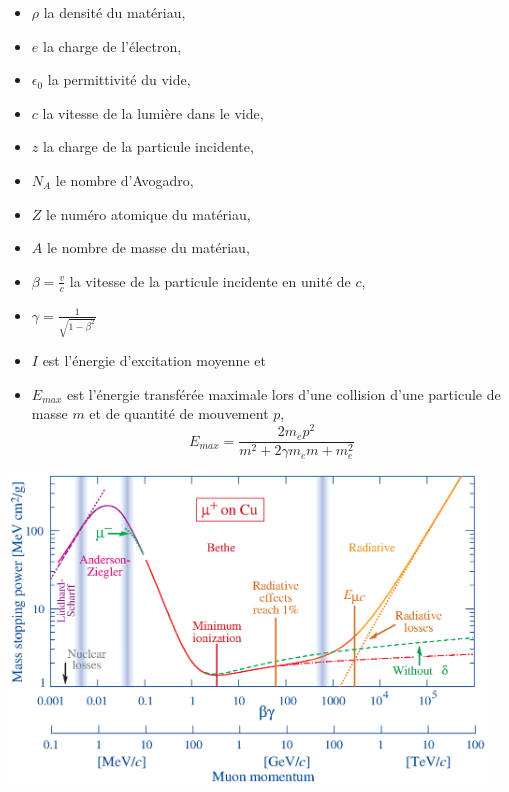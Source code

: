 \begin{itemize}[label=$\bullet$]
	\item $\rho$ la densité du matériau,
	\item $e$ la charge de l'électron,
	\item $\epsilon_{0}$ la permittivité du vide,
	\item $c$ la vitesse de la lumière dans le vide,
	\item $z$ la charge de la particule incidente,
	\item $N_{A}$ le nombre d'Avogadro,
	\item $Z$ le numéro atomique du matériau,
	\item $A$ le nombre de masse du matériau,
	\item $\beta=\frac{v}{c}$ la vitesse de la particule incidente en unité de $c$,
	\item $\gamma=\frac{1}{\sqrt{1-\beta^{2}}}$
	\item $I$ est l'énergie d'excitation moyenne et
	\item $E_{max}$ est l'énergie transférée maximale lors d'une collision d'une particule de masse $m$ et de quantité de mouvement $p$,
	\begin{equation}
	E_{max}=\frac{2m_{e}p^{2}}{m^2+2\gamma m_{e}m+m_{e}^2}
	\end{equation}
\end{itemize}

\begin{minipagewithmarginpars}[h]{0.95\textwidth}
	\centering
	\includegraphics[width=0.95\textwidth]{RPC/Bethe-Bloch.eps}
	\label{Bethe-Block}
\end{minipagewithmarginpars}


